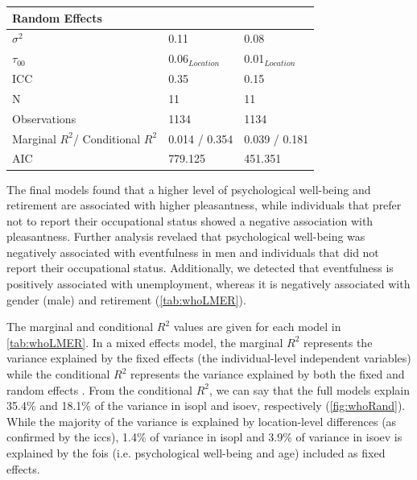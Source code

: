 {\begin{landscape}
\begin{table}[ht]
\begin{tabular}{@{}lcccccc@{}}
  \midrule
  \multicolumn{7}{l}{\textbf{Random Effects}} \\ 
  \midrule
  $\sigma^2$         & \multicolumn{3}{l|}{0.11}               & \multicolumn{3}{l}{0.08}              \\
  $\tau_{00}$        & \multicolumn{3}{l|}{0.06$_{Location}$}  & \multicolumn{3}{l}{0.01$_{Location}$} \\
  ICC                & \multicolumn{3}{l|}{0.35}               & \multicolumn{3}{l}{0.15}              \\
  N                  & \multicolumn{3}{l|}{11}                 & \multicolumn{3}{l}{11}                \\
  \midrule
  Observations       & \multicolumn{3}{l|}{1134}               & \multicolumn{3}{l}{1134}          \\
  Marginal $R^2$/%
  Conditional $R^2$  & \multicolumn{3}{l|}{0.014 / 0.354}      & \multicolumn{3}{l}{0.039 / 0.181} \\
  AIC                & \multicolumn{3}{l|}{779.125}            & \multicolumn{3}{l}{451.351}       \\
  \bottomrule
  \end{tabular}
  \end{table}
  \end{landscape}
}

  The final models found that a higher level of psychological well-being and retirement are associated with higher pleasantness, while individuals that prefer not to report their occupational status showed a negative association with pleasantness. Further analysis revelaed that psychological well-being was negatively associated with eventfulness in men and individuals that did not report their occupational status. Additionally, we detected that eventfulness is positively associated with unemployment, whereas it is negatively associated with gender (male) and retirement (\cref{tab:whoLMER}). 

  The marginal and conditional $R^2$ values are given for each model in \cref{tab:whoLMER}. In a mixed effects model, the marginal $R^2$ represents the variance explained by the fixed effects (the individual-level independent variables) while the conditional $R^2$ represents the variance explained by both the fixed and random effects . From the conditional $R^2$, we can say that the full models explain 35.4\% and 18.1\% of the variance in \gls{isopl} and \gls{isoev}, respectively (\cref{fig:whoRand}). While the majority of the variance is explained by location-level differences (as confirmed by the \glspl{icc}), 1.4\% of variance in \gls{isopl} and 3.9\% of variance in \gls{isoev} is explained by the \glspl{foi} (i.e. psychological well-being and age) included as fixed effects.

